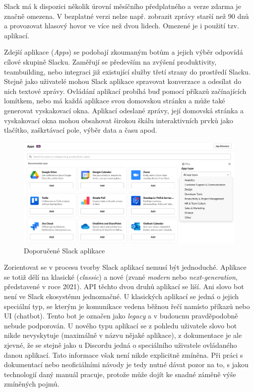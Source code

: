 \documentclass[FM]{tulthesis}
\begin{document}
	Slack má k dispozici několik úrovní měsíčního předplatného a verze zdarma je značně omezena. V bezplatné verzi nelze např. zobrazit zprávy starší než 90 dnů a provozovat hlasový hovor ve více než dvou lidech. Omezené je i použití tzv. aplikací.
	
	Zdejší aplikace (\textit{Apps}) se podobají zkoumaným botům a jejich výběr odpovídá cílové skupině Slacku. Zaměřují se především na zvýšení produktivity, \mbox{teambuilding}, nebo integraci již existující služby třetí strany do prostředí Slacku. Stejně jako uživatelé mohou Slack aplikace spravovat konverzace a odesílat do nich textové zprávy. Ovládání aplikací probíhá buď pomocí příkazů začínajících lomítkem, nebo má každá aplikace svou domovskou stránku a může také generovat vyskakovací okna. Aplikací odeslané zprávy, její domovská stránka a vyskakovací okna mohou obsahovat širokou škálu interaktivních prvků jako tlačítko, zaškrtávací pole, výběr data a času apod.
	
	\begin{figure}[ht]
		\centering
		\includegraphics[width=\textwidth]{img/SlackApps}
		\caption{Doporučené Slack aplikace}
	\end{figure}
	
	Zorientovat se v procesu tvorby Slack aplikací nemusí být jednoduché. Aplikace se totiž dělí na klasické (\textit{classic}) a nové (zvané \textit{modern} nebo \textit{next-generation}, představené v roce 2021). API těchto dvou druhů aplikací se liší. Ani slovo bot není ve Slack ekosystému jednoznačné. U klasických aplikací se jedná o jejich speciální typ, se kterým je komunikace vedena běžnou řečí namísto příkazů nebo UI (chatbot). Tento bot je označen jako \textit{legacy} a v budoucnu pravděpodobně nebude podporován. U nového typu aplikací se z pohledu uživatele slovo bot nikde nevyskytuje (\mbox{maximálně} v názvu nějaké aplikace), z dokumentace je ale zjevné, že se stejně jako u Discordu jedná o speciálního uživatele ovládaného danou aplikací. Tato informace však není nikde explicitně zmíněna. Při práci s dokumentací nebo neoficiálními návody je tedy nutné dávat pozor na to, s jakou technologií daný manuál pracuje, protože může dojít ke snadné záměně výše zmíněných pojmů.
	
\end{document}
